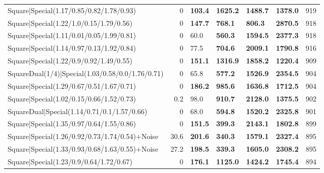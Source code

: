 \begin{tabular}{lrllllr}
 Square|Special(1.17/0.85/0.82/1.78/0.93)                      &             0   & \textbf{103.4} & \textbf{1625.2} & \textbf{1488.7} & \textbf{1378.0} &          919 \\
 Square|Special(1.22/1.0/0.15/1.79/0.56)                       &             0   & \textbf{147.7} & \textbf{768.1}  & \textbf{806.3}  & \textbf{2870.5} &          918 \\
 Square|Special(1.11/0.01/0.05/1.99/0.81)                      &             0   & 60.0           & \textbf{560.3}  & \textbf{1594.5} & \textbf{2377.3} &          918 \\
 Square|Special(1.14/0.97/0.13/1.92/0.84)                      &             0   & 77.5           & \textbf{704.6}  & \textbf{2009.1} & \textbf{1790.8} &          916 \\
 Square|Special(1.22/0.9/0.92/1.49/0.55)                       &             0   & \textbf{151.1} & \textbf{1316.9} & \textbf{1858.2} & \textbf{1220.4} &          909 \\
 SquareDual(1/4)|Special(1.03/0.58/0.0/1.76/0.71)              &             0   & 65.8           & \textbf{577.2}  & \textbf{1526.9} & \textbf{2354.5} &          904 \\
 Square|Special(1.29/0.67/0.51/1.67/0.71)                      &             0   & \textbf{186.2} & \textbf{985.6}  & \textbf{1636.8} & \textbf{1712.5} &          904 \\
 Square|Special(1.02/0.15/0.66/1.52/0.73)                      &             0.2 & 98.0           & \textbf{910.7}  & \textbf{2128.0} & \textbf{1375.5} &          902 \\
 SquareDual|Special(1.14/0.71/0.1/1.57/0.66)                   &             0   & 68.0           & \textbf{594.8}  & \textbf{1520.2} & \textbf{2325.8} &          901 \\
 Square|Special(1.35/0.97/0.64/1.55/0.86)                      &             0   & \textbf{151.5} & \textbf{399.3}  & \textbf{2143.1} & \textbf{1802.8} &          899 \\
 Square|Special(1.26/0.92/0.73/1.74/0.54)+Noise                &            30.6 & \textbf{201.6} & \textbf{340.3}  & \textbf{1579.1} & \textbf{2327.4} &          895 \\
 Square|Special(1.33/0.93/0.68/1.63/0.55)+Noise                &            27.2 & \textbf{198.5} & \textbf{339.3}  & \textbf{1605.0} & \textbf{2308.2} &          895 \\
 Square|Special(1.23/0.9/0.64/1.72/0.67)                       &             0   & \textbf{176.1} & \textbf{1125.0} & \textbf{1424.2} & \textbf{1745.4} &          894 \\

\end{tabular}
